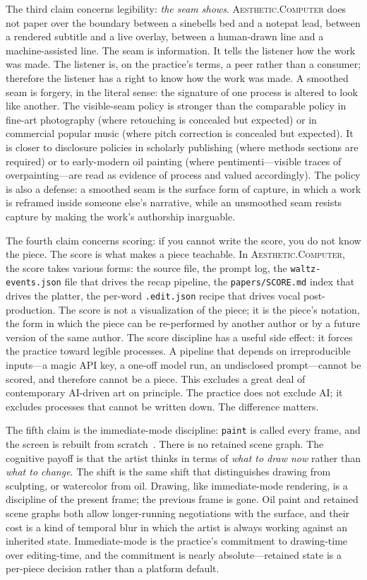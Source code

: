 \documentclass[10pt,letterpaper,twocolumn]{article}
\newcommand{\ac}{\textsc{Aesthetic.Computer}}
\begin{document}
The third claim concerns legibility: \emph{the seam shows}. \ac{} does not paper over the boundary between a sinebells bed and a notepat lead, between a rendered subtitle and a live overlay, between a human-drawn line and a machine-assisted line. The seam is information. It tells the listener how the work was made. The listener is, on the practice's terms, a peer rather than a consumer; therefore the listener has a right to know how the work was made. A smoothed seam is forgery, in the literal sense: the signature of one process is altered to look like another. The visible-seam policy is stronger than the comparable policy in fine-art photography (where retouching is concealed but expected) or in commercial popular music (where pitch correction is concealed but expected). It is closer to disclosure policies in scholarly publishing (where methods sections are required) or to early-modern oil painting (where pentimenti---visible traces of overpainting---are read as evidence of process and valued accordingly). The policy is also a defense: a smoothed seam is the surface form of capture, in which a work is reframed inside someone else's narrative, while an unsmoothed seam resists capture by making the work's authorship inarguable.

The fourth claim concerns scoring: if you cannot write the score, you do not know the piece. The score is what makes a piece teachable. In \ac{}, the score takes various forms: the source file, the prompt log, the \texttt{waltz-events.json} file that drives the recap pipeline, the \texttt{papers/SCORE.md} index that drives the platter, the per-word \texttt{.edit.json} recipe that drives vocal post-production. The score is not a visualization of the piece; it is the piece's notation, the form in which the piece can be re-performed by another author or by a future version of the same author. The score discipline has a useful side effect: it forces the practice toward legible processes. A pipeline that depends on irreproducible inputs---a magic API key, a one-off model run, an undisclosed prompt---cannot be scored, and therefore cannot be a piece. This excludes a great deal of contemporary AI-driven art on principle. The practice does not exclude AI; it excludes processes that cannot be written down. The difference matters.

The fifth claim is the immediate-mode discipline: \texttt{paint} is called every frame, and the screen is rebuilt from scratch~\citep{montfort201210print}. There is no retained scene graph. The cognitive payoff is that the artist thinks in terms of \emph{what to draw now} rather than \emph{what to change}. The shift is the same shift that distinguishes drawing from sculpting, or watercolor from oil. Drawing, like immediate-mode rendering, is a discipline of the present frame; the previous frame is gone. Oil paint and retained scene graphs both allow longer-running negotiations with the surface, and their cost is a kind of temporal blur in which the artist is always working against an inherited state. Immediate-mode is the practice's commitment to drawing-time over editing-time, and the commitment is nearly absolute---retained state is a per-piece decision rather than a platform default.
\end{document}
